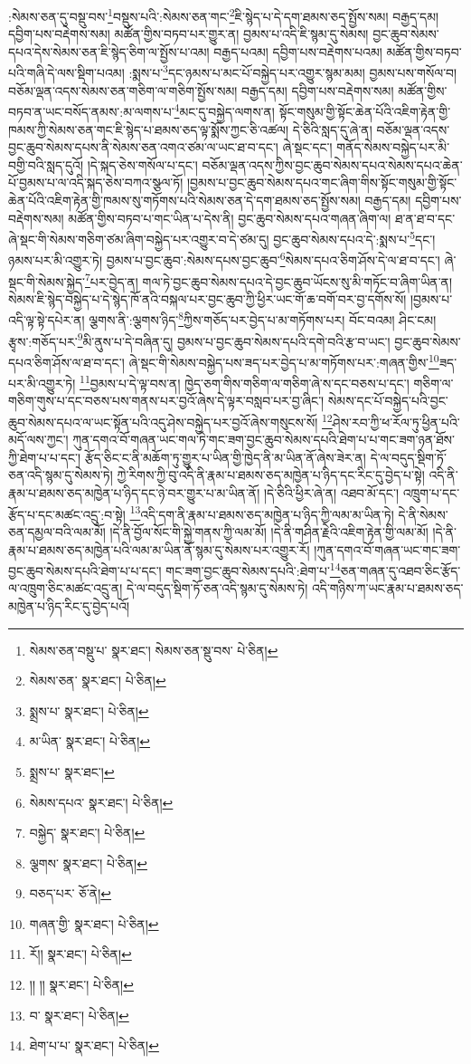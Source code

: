 :སེམས་ཅན་དུ་བསྡུ་བས་\footnote{སེམས་ཅན་བསྡུ་པ་  སྣར་ཐང་། སེམས་ཅན་སྡུ་བས་  པེ་ཅིན། }བསྡུས་པའི་:སེམས་ཅན་གང་\footnote{སེམས་ཅན་  སྣར་ཐང་།  པེ་ཅིན། }ཇི་སྙེད་པ་དེ་དག་ཐམས་ཅད་སྤྱོས་སམ། བརྒྱད་དམ། དབྱིག་པས་བརྡེགས་སམ། མཚོན་གྱིས་བཏབ་པར་གྱུར་ན། བྱམས་པ་འདི་ཇི་སྙམ་དུ་སེམས། བྱང་ཆུབ་སེམས་དཔའ་དེས་སེམས་ཅན་ཇི་སྙེད་ཅིག་ལ་སྤྱོས་པ་འམ། བརྒྱད་པའམ། དབྱིག་པས་བརྡེགས་པའམ། མཚོན་གྱིས་བཏབ་པའི་གཞི་དེ་ལས་སྡིག་པའམ། :སྨས་པ་\footnote{སྨྲས་པ་  སྣར་ཐང་།  པེ་ཅིན། }དང་ཉམས་པ་མང་པོ་བསྐྱེད་པར་འགྱུར་སྙམ་མམ། བྱམས་པས་གསོལ་བ། བཅོམ་ལྡན་འདས་སེམས་ཅན་གཅིག་ལ་གཅིག་སྤྱོས་སམ། བརྒྱད་དམ། དབྱིག་པས་བརྡེགས་སམ། མཚོན་གྱིས་བཏབ་ན་ཡང་བསོད་ནམས་:མ་ལགས་པ་\footnote{མ་ཡིན་  སྣར་ཐང་།  པེ་ཅིན། }མང་དུ་བསྐྱེད་ལགས་ན། སྟོང་གསུམ་གྱི་སྟོང་ཆེན་པོའི་འཇིག་རྟེན་གྱི་ཁམས་ཀྱི་སེམས་ཅན་གང་ཇི་སྙེད་པ་ཐམས་ཅད་ལྟ་སྨོས་ཀྱང་ཅི་འཚལ། དེ་ཅིའི་སླད་དུ་ཞེ་ན། བཅོམ་ལྡན་འདས་བྱང་ཆུབ་སེམས་དཔས་ནི་སེམས་ཅན་འགའ་ཙམ་ལ་ཡང་ཐ་བ་དང་། ཞེ་སྡང་དང་། གནོད་སེམས་བསྐྱེད་པར་མི་བགྱི་བའི་སླད་དུའོ། །དེ་སྐད་ཅེས་གསོལ་པ་དང་། བཅོམ་ལྡན་འདས་ཀྱིས་བྱང་ཆུབ་སེམས་དཔའ་སེམས་དཔའ་ཆེན་པོ་བྱམས་པ་ལ་འདི་སྐད་ཅེས་བཀའ་སྩལ་ཏོ། །བྱམས་པ་བྱང་ཆུབ་སེམས་དཔའ་གང་ཞིག་གིས་སྟོང་གསུམ་གྱི་སྟོང་ཆེན་པོའི་འཇིག་རྟེན་གྱི་ཁམས་སུ་གཏོགས་པའི་སེམས་ཅན་དེ་དག་ཐམས་ཅད་སྤྱོས་སམ། བརྒྱད་དམ། དབྱིག་པས་བརྡེགས་སམ། མཚོན་གྱིས་བཏབ་པ་གང་ཡིན་པ་དེས་ནི། བྱང་ཆུབ་སེམས་དཔའ་གཞན་ཞིག་ལ། ཐ་ན་ཐ་བ་དང་ཞེ་སྡང་གི་སེམས་གཅིག་ཙམ་ཞིག་བསྐྱེད་པར་འགྱུར་བ་དེ་ཙམ་དུ། བྱང་ཆུབ་སེམས་དཔའ་དེ་:སྨས་པ་\footnote{སྨྲས་པ་  སྣར་ཐང་། }དང་། ཉམས་པར་མི་འགྱུར་ཏེ། བྱམས་པ་བྱང་ཆུབ་:སེམས་དཔས་བྱང་ཆུབ་\footnote{སེམས་དཔའ་  སྣར་ཐང་།  པེ་ཅིན། }སེམས་དཔའ་ཅིག་ཤོས་དེ་ལ་ཐ་བ་དང་། ཞེ་སྡང་གི་སེམས་སྐྱེད་\footnote{བསྐྱེད་  སྣར་ཐང་།  པེ་ཅིན། }པར་བྱེད་ན། གལ་ཏེ་བྱང་ཆུབ་སེམས་དཔའ་དེ་བྱང་ཆུབ་ཡོངས་སུ་མི་གཏོང་བ་ཞིག་ཡིན་ན། སེམས་ཇི་སྙེད་བསྐྱེད་པ་དེ་སྙེད་ཁོ་ནའི་བསྐལ་པར་བྱང་ཆུབ་ཀྱི་ཕྱིར་ཡང་གོ་ཆ་བགོ་བར་བྱ་དགོས་སོ། །བྱམས་པ་འདི་ལྟ་སྟེ་དཔེར་ན། ལྕགས་ནི་:ལྕགས་ཉིད་\footnote{ལྕགས་  སྣར་ཐང་།  པེ་ཅིན། }ཀྱིས་གཅོད་པར་བྱེད་པ་མ་གཏོགས་པར། བོང་བའམ། ཤིང་ངམ། རྩྭས་:གཅོད་པར་\footnote{བཅད་པར་  ཅོ་ནེ། }མི་ནུས་པ་དེ་བཞིན་དུ། བྱམས་པ་བྱང་ཆུབ་སེམས་དཔའི་དགེ་བའི་རྩ་བ་ཡང་། བྱང་ཆུབ་སེམས་དཔའ་ཅིག་ཤོས་ལ་ཐ་བ་དང་། ཞེ་སྡང་གི་སེམས་བསྐྱེད་པས་ཟད་པར་བྱེད་པ་མ་གཏོགས་པར་:གཞན་གྱིས་\footnote{གཞན་གྱི་  སྣར་ཐང་།  པེ་ཅིན། }ཟད་པར་མི་འགྱུར་ཏེ། \footnote{རོ།།   སྣར་ཐང་།  པེ་ཅིན། }བྱམས་པ་དེ་ལྟ་བས་ན། ཁྱེད་ཅག་གིས་གཅིག་ལ་གཅིག་ཞེ་ས་དང་བཅས་པ་དང་། གཅིག་ལ་གཅིག་གུས་པ་དང་བཅས་པས་གནས་པར་བྱའོ་ཞེས་དེ་ལྟར་བསླབ་པར་བྱ་ཞིང་། སེམས་དང་པོ་བསྐྱེད་པའི་བྱང་ཆུབ་སེམས་དཔའ་ལ་ཡང་སྟོན་པའི་འདུ་ཤེས་བསྐྱེད་པར་བྱའོ་ཞེས་གསུངས་སོ། \footnote{།། །།  སྣར་ཐང་།  པེ་ཅིན། }ཤེས་རབ་ཀྱི་ཕ་རོལ་ཏུ་ཕྱིན་པའི་མདོ་ལས་ཀྱང་། ཀུན་དགའ་བོ་གཞན་ཡང་གལ་ཏེ་གང་ཟག་བྱང་ཆུབ་སེམས་དཔའི་ཐེག་པ་པ་གང་ཟག་ཉན་ཐོས་ཀྱི་ཐེག་པ་པ་དང་། རྩོད་ཅིང་ང་ནི་མཆོག་ཏུ་གྱུར་པ་ཡིན་གྱི་ཁྱེད་ནི་མ་ཡིན་ནོ་ཞེས་ཟེར་ན། དེ་ལ་བདུད་སྡིག་ཏོ་ཅན་འདི་སྙམ་དུ་སེམས་ཏེ། ཀྱེ་རིགས་ཀྱི་བུ་འདི་ནི་རྣམ་པ་ཐམས་ཅད་མཁྱེན་པ་ཉིད་དང་རིང་དུ་བྱེད་པ་སྟེ། འདི་ནི་རྣམ་པ་ཐམས་ཅད་མཁྱེན་པ་ཉིད་དང་ཉེ་བར་གྱུར་པ་མ་ཡིན་ནོ། །དེ་ཅིའི་ཕྱིར་ཞེ་ན། འཐབ་མོ་དང་། འཁྲུག་པ་དང་རྩོད་པ་དང་མཚང་འདྲུ་:བ་སྟེ། \footnote{བ་  སྣར་ཐང་།  པེ་ཅིན། }འདི་དག་ནི་རྣམ་པ་ཐམས་ཅད་མཁྱེན་པ་ཉིད་ཀྱི་ལམ་མ་ཡིན་ཏེ། དེ་ནི་སེམས་ཅན་དམྱལ་བའི་ལམ་མོ། །དེ་ནི་བྱོལ་སོང་གི་སྐྱེ་གནས་ཀྱི་ལམ་མོ། །དེ་ནི་གཤིན་རྗེའི་འཇིག་རྟེན་གྱི་ལམ་མོ། །དེ་ནི་རྣམ་པ་ཐམས་ཅད་མཁྱེན་པའི་ལམ་མ་ཡིན་ནོ་སྙམ་དུ་སེམས་པར་འགྱུར་རོ། །ཀུན་དགའ་བོ་གཞན་ཡང་གང་ཟག་བྱང་ཆུབ་སེམས་དཔའི་ཐེག་པ་པ་དང་། གང་ཟག་བྱང་ཆུབ་སེམས་དཔའི་:ཐེག་པ་\footnote{ཐེག་པ་པ་  སྣར་ཐང་།  པེ་ཅིན། }ཅན་གཞན་དུ་འཐབ་ཅིང་རྩོད་ལ་འཁྲུག་ཅིང་མཚང་འདྲུ་ན། དེ་ལ་བདུད་སྡིག་ཏོ་ཅན་འདི་སྙམ་དུ་སེམས་ཏེ། འདི་གཉིས་ཀ་ཡང་རྣམ་པ་ཐམས་ཅད་མཁྱེན་པ་ཉིད་རིང་དུ་བྱེད་པའོ། 